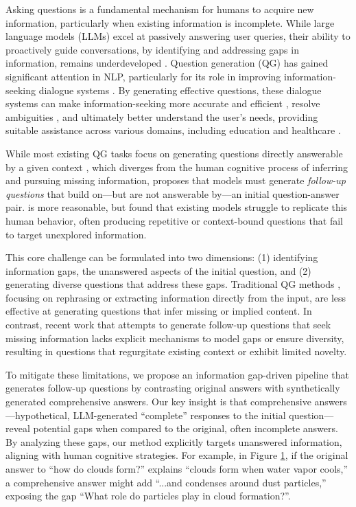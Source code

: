 Asking questions is a fundamental mechanism for humans to acquire new information, particularly when existing information is incomplete. While large language models (LLMs) excel at passively answering user queries, their ability to proactively guide conversations, by identifying and addressing gaps in information, remains underdeveloped \cite{liu-etal-2025-superficial}. Question generation (QG) has gained significant attention in NLP, particularly for its role in improving information-seeking dialogue systems \cite{chen-etal-2024-learning-retrieve}. By generating effective questions, these dialogue systems can make information-seeking more accurate and efficient \cite{qi-etal-2020-stay}, resolve ambiguities \cite{li2017learning}, and ultimately better understand the user's needs, providing suitable assistance across various domains, including education \cite{laban-etal-2022-quiz} and healthcare \cite{arslan2024accuracy, li2024mediq}.

While most existing QG tasks focus on generating questions directly answerable by a given context \cite{ zhao-etal-2018-paragraph, pan-etal-2020-semantic, ghanem-etal-2022-question}, which diverges from the human cognitive process of inferring and pursuing missing information, \citet{meng-etal-2023-followupqg} proposes that models must generate \emph{follow-up questions} that build on---but are not answerable by---an initial question-answer pair. \fd{} is more reasonable, but \citet{meng-etal-2023-followupqg} found that existing models struggle to replicate this human behavior, often producing repetitive or context-bound questions that fail to target unexplored information.

This core challenge can be formulated into two dimensions: (1) identifying information gaps, the unanswered aspects of the initial question, and (2) generating diverse questions that address these gaps. Traditional QG methods \cite{zhao-etal-2018-paragraph, pan-etal-2020-semantic, ghanem-etal-2022-question}, focusing on rephrasing or extracting information directly from the input, are less effective at generating questions that infer missing or implied content. In contrast, recent work \cite{mazzaccara-etal-2024-learning,liu-etal-2025-superficial} that attempts to generate follow-up questions that seek missing information lacks explicit mechanisms to model gaps or ensure diversity, resulting in questions that regurgitate existing context or exhibit limited novelty.

To mitigate these limitations, we propose an information gap-driven pipeline that generates follow-up questions by contrasting original answers with synthetically generated comprehensive answers. Our key insight is that comprehensive answers---hypothetical, LLM-generated ``complete'' responses to the initial question---reveal potential gaps when compared to the original, often incomplete answers. By analyzing these gaps, our method explicitly targets unanswered information, aligning with human cognitive strategies. For example, in Figure \hyperref[fig:teaser]{1}, if the original answer to ``how do clouds form?'' explains ``clouds form when water vapor cools,'' a comprehensive answer might add ``...and condenses around dust particles,'' exposing the gap ``What role do particles play in cloud formation?''. 

